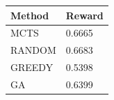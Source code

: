 \begin{tabular}{ll}
\hline
Method & Reward \\
\hline
  MCTS & 0.6665 \\
  RANDOM & 0.6683 \\
  GREEDY & 0.5398 \\
  GA & 0.6399 \\
\hline
\end{tabular}
